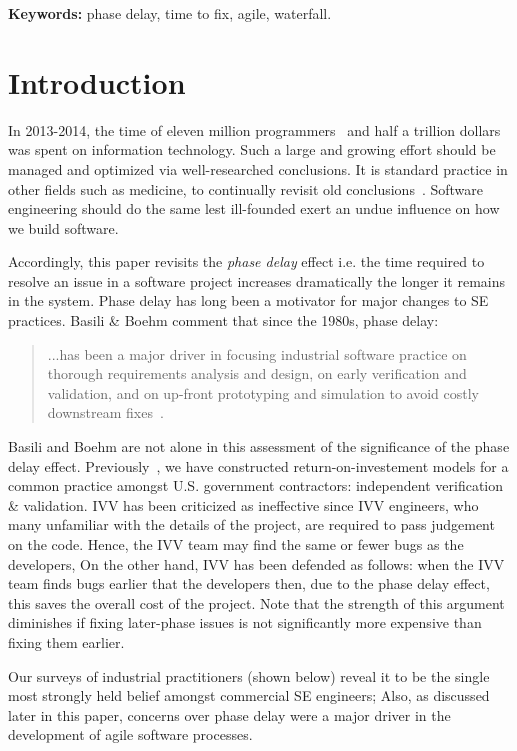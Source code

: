 \documentclass{sig-alternate}
\begin{document}
\vspace{1mm}
\noindent
{\bf Keywords:} phase delay, time to fix, agile, waterfall.

\section{Introduction}
In 2013-2014, the time of 
eleven  million programmers~\cite{pettey14} and
half a trillion dollars~\cite{avram14} was spent on information technology.
Such a large and growing effort should be managed and optimized via  well-researched conclusions.  
It is standard practice
in other fields such as medicine,
to continually revisit old conclusions~\cite{prasad13}. Software engineering should do the same lest
ill-founded  exert an undue influence on how we build software.  

Accordingly, this paper revisits
the {\em phase delay} effect
i.e.  the time required to resolve an issue in a software project increases dramatically 
the longer it remains in the system. 
Phase delay has long been
a    motivator for major changes to
SE practices. Basili \& Boehm comment that since the 1980s,  phase delay:
\begin{quote}
...has been a major driver in focusing
industrial software practice on thorough
requirements analysis and design,
on early verification and validation, and
on up-front prototyping and simulation
to avoid costly downstream fixes~\cite{boehm01}.
\end{quote}
Basili and Boehm are not alone in this assessment of the significance of the phase delay effect.
Previously~\cite{me08a}, we have constructed return-on-investement models
for a common practice amongst U.S. government contractors: 
independent verification \& validation. IVV has been criticized as
ineffective since IVV engineers, who many  unfamiliar with the details of the project, are required to pass judgement on the code.
Hence,  the IVV team may find the same or fewer bugs
as the developers,
On the other hand, IVV has been defended
as follows:  when the IVV team finds bugs earlier that the developers then, due to the phase delay effect, this saves the overall cost of the project. Note that the strength of this argument diminishes
if fixing later-phase issues is not significantly more expensive than fixing them earlier. 


Our surveys of  industrial practitioners (shown below) reveal it to be
the single most strongly held belief amongst commercial SE engineers;
Also,
as discussed later
in this paper, concerns over phase delay were a major driver in the development of agile software
processes.
\end{document}
